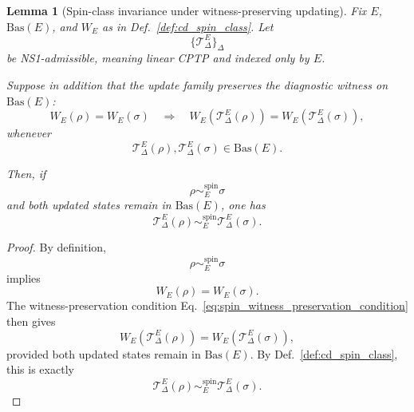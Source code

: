 \documentclass[aps,prx,onecolumn,11pt]{revtex4-2}
\theoremstyle{plain}
\newtheorem{lemma}{Lemma}
\theoremstyle{definition}
\theoremstyle{remark}
\begin{document}
\begin{lemma}[Spin-class invariance under witness-preserving updating]
\label{lem:spin_class_invariance_NS1}
Fix \(E\), \(\mathrm{Bas}(E)\), and \(W_E\) as in
Def.~\ref{def:cd_spin_class}. Let
\[
\{\mathcal{T}^E_\Delta\}_\Delta
\]
be NS1-admissible, meaning linear CPTP and indexed only by \(E\).

Suppose in addition that the update family preserves the diagnostic
witness on \(\mathrm{Bas}(E)\):
\begin{equation}
W_E(\rho)=W_E(\sigma)
\quad\Longrightarrow\quad
W_E\!\left(\mathcal{T}^E_\Delta(\rho)\right)
=
W_E\!\left(\mathcal{T}^E_\Delta(\sigma)\right),
\label{eq:spin_witness_preservation_condition}
\end{equation}
whenever
\[
\mathcal{T}^E_\Delta(\rho),
\mathcal{T}^E_\Delta(\sigma)
\in
\mathrm{Bas}(E).
\]

Then, if
\[
\rho\sim^{\mathrm{spin}}_E\sigma
\]
and both updated states remain in \(\mathrm{Bas}(E)\), one has
\begin{equation}
\mathcal{T}^E_\Delta(\rho)
\sim^{\mathrm{spin}}_E
\mathcal{T}^E_\Delta(\sigma).
\end{equation}
\end{lemma}

\begin{proof}
By definition,
\[
\rho\sim^{\mathrm{spin}}_E\sigma
\]
implies
\[
W_E(\rho)=W_E(\sigma).
\]
The witness-preservation condition
Eq.~\eqref{eq:spin_witness_preservation_condition} then gives
\[
W_E\!\left(\mathcal{T}^E_\Delta(\rho)\right)
=
W_E\!\left(\mathcal{T}^E_\Delta(\sigma)\right),
\]
provided both updated states remain in \(\mathrm{Bas}(E)\). By
Def.~\ref{def:cd_spin_class}, this is exactly
\[
\mathcal{T}^E_\Delta(\rho)
\sim^{\mathrm{spin}}_E
\mathcal{T}^E_\Delta(\sigma).
\]
\end{proof}
\end{document}
